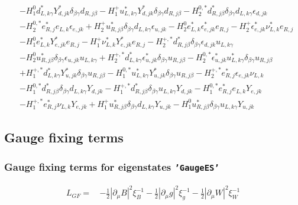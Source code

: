 \begin{align}
 &- H_1^0 d^*_{L,{k \gamma}} Y^*_{d,{j k}} \delta_{\beta \gamma} d_{R,{j \beta}} - H_1^+ u^*_{L,{k \gamma}} Y^*_{d,{j k}} \delta_{\beta \gamma} d_{R,{j \beta}} - H_2^{0,*} d^*_{R,{j \beta}} \delta_{\beta \gamma} d_{L,{k \gamma}} \epsilon_{d,{j k}} \nonumber \\ 
 &- H_2^{0,*} e^*_{R,{j}} e_{L,{k}} \epsilon_{e,{j k}} +H_2^+ u^*_{R,{j \beta}} \delta_{\beta \gamma} d_{L,{k \gamma}} \epsilon_{u,{j k}} - H_2^0 e^*_{L,{k}} \epsilon^*_{e,{j k}} e_{R,{j}} - H_2^+ \epsilon^*_{e,{j k}} \nu^*_{L,{k}} e_{R,{j}} \nonumber \\ 
 &- H_1^0 e^*_{L,{k}} Y^*_{e,{j k}} e_{R,{j}} - H_1^+ \nu^*_{L,{k}} Y^*_{e,{j k}} e_{R,{j}} - H_2^{+,*} d^*_{R,{j \beta}} \delta_{\beta \gamma} \epsilon_{d,{j k}} u_{L,{k \gamma}} \nonumber \\ 
 &- H_2^0 u^*_{R,{j \beta}} \delta_{\beta \gamma} \epsilon_{u,{j k}} u_{L,{k \gamma}} +H_2^{+,*} d^*_{L,{k \gamma}} \epsilon^*_{u,{j k}} \delta_{\beta \gamma} u_{R,{j \beta}} - H_2^{0,*} \epsilon^*_{u,{j k}} u^*_{L,{k \gamma}} \delta_{\beta \gamma} u_{R,{j \beta}} \nonumber \\ 
 &+H_1^{+,*} d^*_{L,{k \gamma}} Y^*_{u,{j k}} \delta_{\beta \gamma} u_{R,{j \beta}} - H_1^{0,*} u^*_{L,{k \gamma}} Y^*_{u,{j k}} \delta_{\beta \gamma} u_{R,{j \beta}} - H_2^{+,*} e^*_{R,{j}} \epsilon_{e,{j k}} \nu_{L,{k}} \nonumber \\ 
 &- H_1^{0,*} d^*_{R,{j \beta}} \delta_{\beta \gamma} d_{L,{k \gamma}} Y_{d,{j k}} - H_1^{+,*} d^*_{R,{j \beta}} \delta_{\beta \gamma} u_{L,{k \gamma}} Y_{d,{j k}} - H_1^{0,*} e^*_{R,{j}} e_{L,{k}} Y_{e,{j k}} \nonumber \\ 
 &- H_1^{+,*} e^*_{R,{j}} \nu_{L,{k}} Y_{e,{j k}} +H_1^+ u^*_{R,{j \beta}} \delta_{\beta \gamma} d_{L,{k \gamma}} Y_{u,{j k}} - H_1^0 u^*_{R,{j \beta}} \delta_{\beta \gamma} u_{L,{k \gamma}} Y_{u,{j k}} 
\end{align} 
\subsection{Gauge fixing terms} 
\subsubsection{Gauge fixing terms for eigenstates {\tt 'GaugeES'} } 
\begin{align} 
L_{GF} = \, &-\frac{1}{2} |\partial_{\mu}B|^2 \xi_{B}^{-1}  -\frac{1}{2} |\partial_{\mu}g|^2 \xi_{g}^{-1}  -\frac{1}{2} |\partial_{\mu}W|^2 \xi_{W}^{-1} 
\end{align} 
